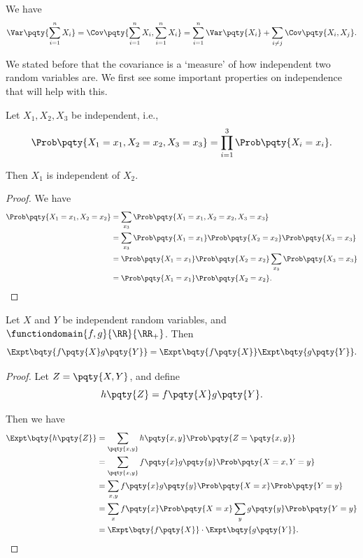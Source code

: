 \begin{corollary}
    \label{cor:variance-of-sum}%
    We have
    \[
        \Var\pqty{\sum_{i = 1}^{n} X_i} = \Cov\pqty{\sum_{i = 1}^{n} X_i, \sum_{i = 1}^{n} X_i} = \sum_{i = 1}^{n} \Var\pqty{X_i} + \sum_{i \neq j} \Cov\pqty{X_i, X_j}.
    \]
\end{corollary}

We stated before that the covariance is a `measure' of how independent two random variables are. We first see some important properties on independence that will help with this.

\begin{lemma}
    \label{lem:indep-pairwise-indep}%
    Let \(X_1, X_2, X_3\) be independent, i.e.,
    \[
        \Prob\pqty{X_1 = x_1, X_2 = x_2, X_3 = x_3} = \prod_{i = 1}^{3} \Prob\pqty{X_i = x_i}.
    \]

    Then \(X_1\) is independent of \(X_2\).
\end{lemma}

\begin{proof}
    We have
    \begin{align*}
        \Prob\pqty{X_1 = x_1, X_2 = x_2} &= \sum_{x_3} \Prob\pqty{X_1 = x_1, X_2 = x_2, X_3 = x_3} \\
        &= \sum_{x_3} \Prob\pqty{X_1 = x_1} \Prob\pqty{X_2 = x_2} \Prob\pqty{X_3 = x_3} \\
        &= \Prob\pqty{X_1 = x_1} \Prob\pqty{X_2 = x_2} \sum_{x_3} \Prob\pqty{X_3 = x_3} \\
        &= \Prob\pqty{X_1 = x_1} \Prob\pqty{X_2 = x_2}.
    \end{align*}
\end{proof}

\begin{lemma}
    \label{lem:independence-expectation-product}%
    Let \(X\) and \(Y\) be independent random variables, and \(\functiondomain{f, g}{\RR}{\RR_{+}}\). Then
    \[
        \Expt\bqty{f\pqty{X} g\pqty{Y}} = \Expt\bqty{f\pqty{X}} \Expt\bqty{g\pqty{Y}}.
    \]
\end{lemma}

\begin{proof}
    Let \(Z = \pqty{X, Y}\), and define
    \[  
        h\pqty{Z} = f\pqty{X} g\pqty{Y}.
    \]

    Then we have
    \begin{align*}
        \Expt\bqty{h\pqty{Z}} &= \sum_{\pqty{x, y}} h\pqty{x, y} \Prob\pqty{Z = \pqty{x, y}} \\
        &= \sum_{\pqty{x, y}} f\pqty{x} g\pqty{y} \Prob\pqty{X = x, Y = y} \\
        &= \sum_{x, y} f\pqty{x} g\pqty{y} \Prob\pqty{X = x} \Prob\pqty{Y = y} \\
        &= \sum_{x} f\pqty{x} \Prob\pqty{X = x} \sum_{y} g\pqty{y} \Prob\pqty{Y = y} \\
        &= \Expt\bqty{f\pqty{X}} \cdot \Expt\bqty{g\pqty{Y}}.
    \end{align*}
\end{proof}

